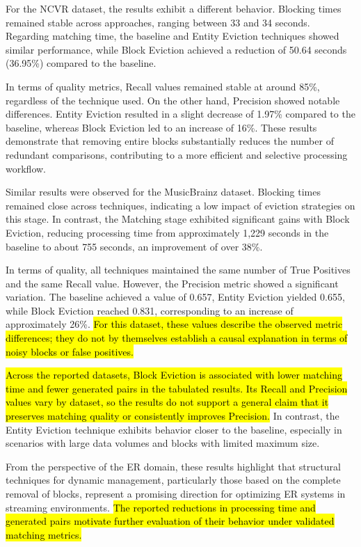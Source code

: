 \documentclass{ieeeaccess}
\begin{document}
For the NCVR dataset, the results exhibit a different behavior. Blocking times remained stable across approaches, ranging between 33 and 34 seconds. Regarding matching time, the baseline and Entity Eviction techniques showed similar performance, while Block Eviction achieved a reduction of 50.64 seconds (36.95\%) compared to the baseline.

In terms of quality metrics, Recall values remained stable at around 85\%, regardless of the technique used. On the other hand, Precision showed notable differences. Entity Eviction resulted in a slight decrease of 1.97\% compared to the baseline, whereas Block Eviction led to an increase of 16\%. These results demonstrate that removing entire blocks substantially reduces the number of redundant comparisons, contributing to a more efficient and selective processing workflow.

Similar results were observed for the MusicBrainz dataset. Blocking times remained close across techniques, indicating a low impact of eviction strategies on this stage. In contrast, the Matching stage exhibited significant gains with Block Eviction, reducing processing time from approximately 1,229 seconds in the baseline to about 755 seconds, an improvement of over 38\%.

In terms of quality, all techniques maintained the same number of True Positives and the same Recall value. However, the Precision metric showed a significant variation. The baseline achieved a value of 0.657, Entity Eviction yielded 0.655, while Block Eviction reached 0.831, corresponding to an increase of approximately 26\%. \hl{For this dataset, these values describe the observed metric differences; they do not by themselves establish a causal explanation in terms of noisy blocks or false positives.}

\hl{Across the reported datasets, Block Eviction is associated with lower matching time and fewer generated pairs in the tabulated results. Its Recall and Precision values vary by dataset, so the results do not support a general claim that it preserves matching quality or consistently improves Precision.} In contrast, the Entity Eviction technique exhibits behavior closer to the baseline, especially in scenarios with large data volumes and blocks with limited maximum size.

From the perspective of the ER domain, these results highlight that structural techniques for dynamic management, particularly those based on the complete removal of blocks, represent a promising direction for optimizing ER systems in streaming environments. \hl{The reported reductions in processing time and generated pairs motivate further evaluation of their behavior under validated matching metrics.}
\end{document}
